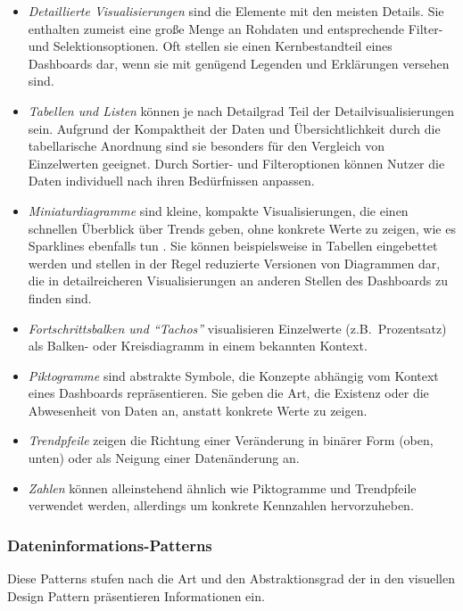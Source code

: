 \begin{itemize}
    \item \emph{Detaillierte Visualisierungen} sind die Elemente mit den meisten Details.
    Sie enthalten zumeist eine große Menge an Rohdaten und entsprechende Filter- und Selektionsoptionen.
    Oft stellen sie einen Kernbestandteil eines Dashboards dar, wenn sie mit genügend Legenden und Erklärungen versehen sind.
    \item \emph{Tabellen und Listen} können je nach Detailgrad Teil der Detailvisualisierungen sein.
    Aufgrund der Kompaktheit der Daten und Übersichtlichkeit durch die tabellarische Anordnung sind sie besonders für den Vergleich von Einzelwerten geeignet.
    Durch Sortier- und Filteroptionen können Nutzer die Daten individuell nach ihren Bedürfnissen anpassen.
    \item \emph{Miniaturdiagramme} sind kleine, kompakte Visualisierungen, die einen schnellen Überblick über Trends geben, ohne konkrete Werte zu zeigen, wie es Sparklines ebenfalls tun \autocite{tufte2006beautiful.2006}.
    Sie können beispielsweise in Tabellen eingebettet werden und stellen in der Regel reduzierte Versionen von Diagrammen dar, die in detailreicheren Visualisierungen an anderen Stellen des Dashboards zu finden sind.
    \item \emph{Fortschrittsbalken und "`Tachos"'} visualisieren Einzelwerte (z.B.\ Prozentsatz) als Balken- oder Kreisdiagramm in einem bekannten Kontext.
    \item \emph{Piktogramme} sind abstrakte Symbole, die Konzepte abhängig vom Kontext eines Dashboards repräsentieren.
    Sie geben die Art, die Existenz oder die Abwesenheit von Daten an, anstatt konkrete Werte zu zeigen.
    \item \emph{Trendpfeile} zeigen die Richtung einer Veränderung in binärer Form (oben, unten) oder als Neigung einer Datenänderung an.
    \item \emph{Zahlen} können alleinstehend ähnlich wie Piktogramme und Trendpfeile verwendet werden, allerdings um konkrete Kennzahlen hervorzuheben.
\end{itemize}

\subsubsection{Dateninformations-Patterns}\label{subsubsec:data-information-patterns}

Diese Patterns stufen nach \autocite[S. 3]{Bach.DashboardDesignPatterns.2023} die Art und den Abstraktionsgrad der in den visuellen Design Pattern präsentieren Informationen ein.

